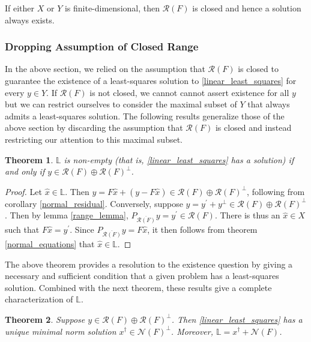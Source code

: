 \documentclass[12pt]{article}
\newcommand{\R}{\mathcal{R}}
\newcommand{\N}{\mathcal{N}}
\newtheorem{thm}{Theorem}
\begin{document}
If either $X$ or $Y$ is finite-dimensional, then $\R(F)$ is closed and hence a solution always exists. 

\subsubsection{Dropping Assumption of Closed Range}

In the above section, we relied on the assumption that $\R(F)$ is closed to guarantee the existence of a least-squares solution
to \eqref{linear_least_squares} for every $y \in Y$. 
If $\R(F)$ is not closed, we cannot cannot assert existence for all $y$  
but we can restrict ourselves to consider the maximal subset of $Y$ that always admits a least-squares solution. 
The following results generalize those of the above section by discarding the assumption that $\R(F)$ is closed and instead 
restricting our attention to this maximal subset. 

\begin{thm} \label{existence_theorem}
$\mathbb{L}$ is non-empty (that is, \eqref{linear_least_squares} has a solution) if and only if $y \in \R(F) \oplus \R(F)^\perp$. 
\end{thm} 

\begin{proof} 
Let $\hat{x} \in \mathbb{L}$. Then $y = F\hat{x} + (y - F\hat{x}) \in \R(F) \oplus \R(F)^\perp$, following from corollary 
\ref{normal_residual}. Conversely, suppose $y = y^\prime + y^\perp \in \R(F) \oplus \R(F)^\perp$. Then by lemma 
\ref{range_lemma}, $P_{\overline{\R(F)}}y = y^\prime \in \R(F)$. There is thus an $\hat{x} \in X$ such that 
$F\hat{x} = y^\prime$. Since $P_{\overline{\R(F)}}y = F\hat{x}$, it then follows from theorem \ref{normal_equations} that 
$\hat{x} \in \mathbb{L}$. 
\end{proof} 

The above theorem provides a resolution to the existence question by giving a necessary and sufficient condition that 
a given problem has a least-squares solution. Combined with the next theorem, these results give a complete
characterization of $\mathbb{L}$. 

\begin{thm} \label{solution_characterization}
Suppose $y \in \R(F) \oplus \R(F)^\perp$. Then \eqref{linear_least_squares} has a unique minimal norm solution $x^\dagger \in \N(F)^\perp$. 
Moreover, $\mathbb{L} = x^\dagger + \N(F)$. 
\end{thm} 
\end{document}
